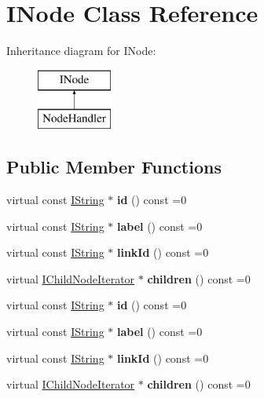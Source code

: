 \hypertarget{class_i_node}{}\section{I\+Node Class Reference}
\label{class_i_node}
Inheritance diagram for I\+Node\+:\begin{figure}[H]
\begin{center}
\leavevmode
\includegraphics[height=2.000000cm]{class_i_node}
\end{center}
\end{figure}
\subsection*{Public Member Functions}
\begin{DoxyCompactItemize}
\item 
\mbox{\label{class_i_node_ace174def23277b4955acde25110649f1}} 
virtual const \mbox{\hyperlink{class_i_string}{I\+String}} $\ast$ {\bfseries id} () const =0
\item 
\mbox{\label{class_i_node_a5ae61240db6dd51f432703bc6afcd780}} 
virtual const \mbox{\hyperlink{class_i_string}{I\+String}} $\ast$ {\bfseries label} () const =0
\item 
\mbox{\label{class_i_node_a941834c05c3a6065c7b8eba675a4b77c}} 
virtual const \mbox{\hyperlink{class_i_string}{I\+String}} $\ast$ {\bfseries link\+Id} () const =0
\item 
\mbox{\label{class_i_node_a3fcd7364b1925a357261c8e7936c0d65}} 
virtual \mbox{\hyperlink{class_i_child_node_iterator}{I\+Child\+Node\+Iterator}} $\ast$ {\bfseries children} () const =0
\item 
\mbox{\label{class_i_node_ace174def23277b4955acde25110649f1}} 
virtual const \mbox{\hyperlink{class_i_string}{I\+String}} $\ast$ {\bfseries id} () const =0
\item 
\mbox{\label{class_i_node_a5ae61240db6dd51f432703bc6afcd780}} 
virtual const \mbox{\hyperlink{class_i_string}{I\+String}} $\ast$ {\bfseries label} () const =0
\item 
\mbox{\label{class_i_node_a941834c05c3a6065c7b8eba675a4b77c}} 
virtual const \mbox{\hyperlink{class_i_string}{I\+String}} $\ast$ {\bfseries link\+Id} () const =0
\item 
\mbox{\label{class_i_node_a3fcd7364b1925a357261c8e7936c0d65}} 
virtual \mbox{\hyperlink{class_i_child_node_iterator}{I\+Child\+Node\+Iterator}} $\ast$ {\bfseries children} () const =0
\end{DoxyCompactItemize}


